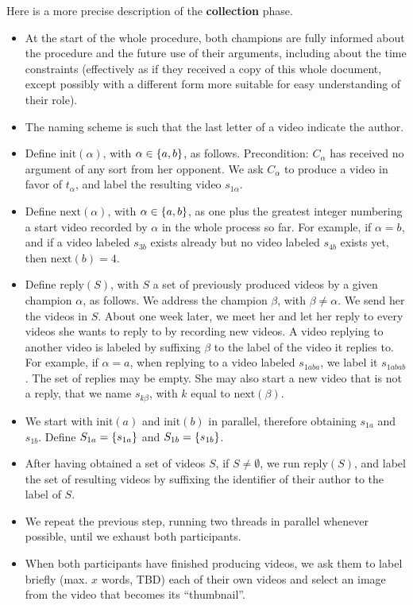 \documentclass[version=3.21, pagesize, twoside=off, bibliography=totoc, DIV=calc, fontsize=12pt, a4paper]{scrartcl}
\begin{document}
Here is a more precise description of the \textbf{collection} phase.

\begin{itemize}
	\item At the start of the whole procedure, both champions are fully informed about the procedure and the future use of their arguments, including about the time constraints (effectively as if they received a copy of this whole document, except possibly with a different form more suitable for easy understanding of their role).
	\item The naming scheme is such that the last letter of a video indicate the author.
	\item Define $\text{init}(\alpha)$, with $\alpha \in \{a, b\}$, as follows. Precondition: $C_\alpha$ has received no argument of any sort from her opponent. We ask $C_\alpha$ to produce a video in favor of $t_\alpha$, and label the resulting video $s_{1 \alpha}$.
	\item Define $\text{next}(\alpha)$, with $\alpha \in \{a, b\}$, as one plus the greatest integer numbering a start video recorded by $\alpha$ in the whole process so far. For example, if $\alpha = b$, and if a video labeled $s_{3b}$ exists already but no video labeled $s_{4b}$ exists yet, then $\text{next}(b) = 4$.
	\item Define $\text{reply}(S)$, with $S$ a set of previously produced videos by a given champion $\alpha$, as follows. We address the champion $\beta$, with $\beta ≠ \alpha$. We send her the videos in $S$. About one week later, we meet her and let her reply to every videos she wants to reply to by recording new videos. A video replying to another video is labeled by suffixing $\beta$ to the label of the video it replies to. For example, if $\alpha = a$, when replying to a video labeled $s_{1aba}$, we label it $s_{1abab}$. The set of replies may be empty. She may also start a new video that is not a reply, that we name $s_{k\beta}$, with $k$ equal to $\text{next}(\beta)$.
	\item We start with $\text{init}(a)$ and $\text{init}(b)$ in parallel, therefore obtaining $s_{1a}$ and $s_{1b}$. Define $S_{1a} = \{s_{1a}\}$ and $S_{1b} = \{s_{1b}\}$.
	\item After having obtained a set of videos $S$, if $S ≠ \emptyset$, we run $\text{reply}(S)$, and label the set of resulting videos by suffixing the identifier of their author to the label of $S$. 
	\item We repeat the previous step, running two threads in parallel whenever possible, until we exhaust both participants.
	\item When both participants have finished producing videos, we ask them to label briefly (max. $x$ words, TBD) each of their own videos and select an image from the video that becomes its “thumbnail”.
\end{itemize}
\end{document}
